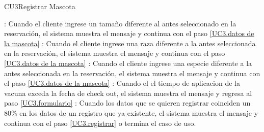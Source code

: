 \begin{UseCase}{CU3}{Registrar Mascota}
{\begin{Titemize}
			: Cuando el cliente ingrese un tamaño diferente al antes seleccionado en la reservación, el sistema muestra el mensaje  y continua con el paso \ref{UC3.datos de la mascota}
			: Cuando el cliente ingrese una raza diferente a la antes seleccionada en la reservación, el sistema muestra el mensaje  y continua con el paso \ref{UC3.datos de la mascota}
			: Cuando el cliente ingrese una especie diferente a la antes seleccionada en la reservación, el sistema muestra el mensaje  y continua con el paso \ref{UC3.datos de la mascota}
			: Cuando el el tiempo de aplicacion de la vacuna exceda la fecha de check out, el sistema muestra el mensaje   y regresa al paso \ref{UC3.formulario}
			: Cuando los datos que se quieren registrar coinciden un 80\% en los datos de un registro que ya existente, el sistema muestra el mensaje   y continua con el paso \ref{UC3.registrar} o termina el caso de uso.
			
		\end{Titemize}
	}
\end{UseCase}

